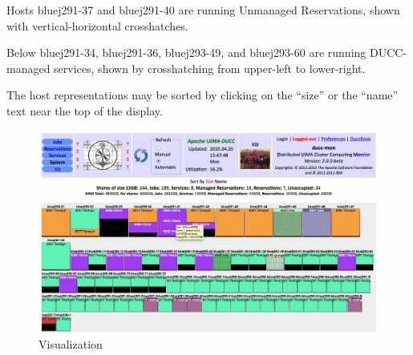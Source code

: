        Hosts bluej291-37 and bluej291-40 are running Unmanaged Reservations, shown with
       vertical-horizontal crosshatches.

       Below bluej291-34, bluej291-36, bluej293-49, and bluej293-60 are running DUCC-managed
       services, shown by crosshatching from upper-left to lower-right.

       The host representations may be sorted by clicking on the ``size'' or the ``name'' text
       near the top of the display.


           \begin{figure}[ht!]
    \centering
    \includegraphics[width=160mm]{images/ducc-webserver/viz.jpg}
    \caption{Visualization}
    \end{figure}

